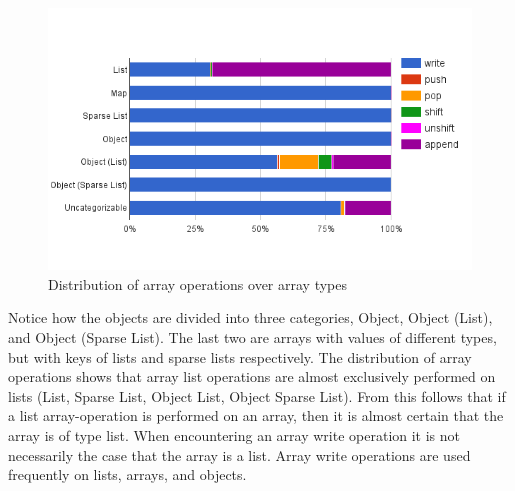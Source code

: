 \begin{figure}
\centering
\includegraphics[width=\textwidth]{chapters/study/g12.png}
\caption{Distribution of array operations over array types}
\label{fig:type_operations}
\end{figure}

Notice how the objects are divided into three categories, Object, Object (List), and Object (Sparse List).  The last two are arrays with values of different types, but with keys of lists and sparse lists respectively. The distribution of array operations shows that array list operations are almost exclusively performed on lists (List, Sparse List, Object List, Object Sparse List). From this follows that if a list array-operation is performed on an array, then it is almost certain that the array is of type list. When encountering an array write operation it is not necessarily the case that the array is a list. Array write operations are used frequently on lists, arrays, and objects.







